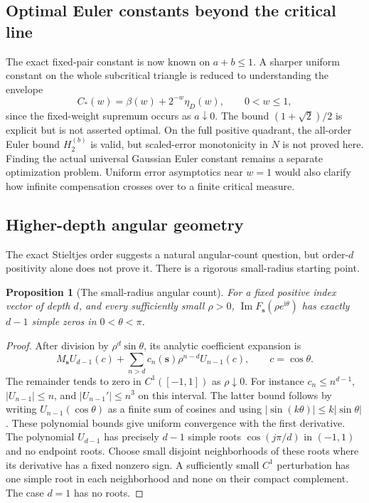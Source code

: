\documentclass[11pt]{article}
\numberwithin{equation}{section}
\newtheorem{proposition}[theorem]{Proposition}
\theoremstyle{definition}
\theoremstyle{remark}
\DeclareMathOperator{\Impart}{Im}
\newcommand{\ii}{\mathrm i}
\newcommand{\sv}{\boldsymbol s}
\begin{document}
\subsection{Optimal Euler constants beyond the critical line}
The exact fixed-pair constant is now known on $a+b\le1$. A sharper
uniform constant on the whole subcritical triangle is reduced to
understanding the envelope
\[
 C_*(w)=\beta(w)+2^{-w}\eta_D(w),\qquad0<w\le1,
\]
since the fixed-weight supremum occurs as $a\downarrow0$.
The bound $(1+\sqrt2)/2$ is explicit but is not asserted optimal.
On the full positive quadrant, the all-order Euler bound $H_2^{(b)}$
is valid, but scaled-error monotonicity in $N$ is not proved here.
Finding the actual universal Gaussian Euler constant remains a separate
optimization problem. Uniform error asymptotics near $w=1$ would also
clarify how infinite compensation crosses over to a finite critical
measure.

\subsection{Higher-depth angular geometry}
The exact Stieltjes order suggests a natural angular-count question,
but order-$d$ positivity alone does not prove it. There is a rigorous
small-radius starting point.
\begin{proposition}[The small-radius angular count]\label{prop:smallcount}
For a fixed positive index vector of depth $d$, and every sufficiently
small $\rho>0$, $\Impart F_{\sv}(\rho e^{\ii\theta})$ has exactly
$d-1$ simple zeros in $0<\theta<\pi$.
\end{proposition}
\begin{proof}
After division by $\rho^d\sin\theta$, its analytic coefficient expansion
is
\[
 M_{\sv}U_{d-1}(c)+\sum_{n>d}c_n(\sv)\rho^{n-d}U_{n-1}(c),
 \qquad c=\cos\theta.
\]
The remainder tends to zero in $C^1([-1,1])$ as $\rho\downarrow0$.
For instance $c_n\le n^{d-1}$, $|U_{n-1}|\le n$, and
$|U_{n-1}'|\le n^3$ on this interval. The latter bound follows by
writing $U_{n-1}(\cos\theta)$ as a finite sum of cosines and using
$|\sin(k\theta)|\le k|\sin\theta|$. These polynomial bounds give
uniform convergence with the first derivative. The polynomial
$U_{d-1}$ has precisely $d-1$ simple roots $\cos(j\pi/d)$ in $(-1,1)$
and no endpoint roots. Choose small disjoint neighborhoods of these
roots where its derivative has a fixed nonzero sign. A sufficiently
small $C^1$ perturbation has one simple root in each neighborhood
and none on their compact complement. The case $d=1$ has no roots.
\end{proof}
\end{document}
